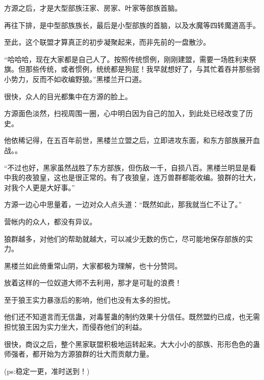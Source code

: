 \begin{this_body}
方源之后，才是大型部族汪家、房家、叶家等部族首脑。

再往下排，是中型部族族长，最后是小型部族的首脑，以及水魔等四转魔道高手。

至此，这个联盟才算真正的初步凝聚起来，而非先前的一盘散沙。

“哈哈哈，现在大家都是自己人了。按照传统惯例，刚刚建盟，需要一场胜利来祭旗。但那些传统，或者惯例，统统都是狗屁！我早就想好了，与其忙着吞并那些弱小势力，反而不如收编野狼。”黑楼兰开口道。

很快，众人的目光都集中在方源的脸上。

方源面色淡然，扫视周围一圈，心中明白因为自己的加入，到此处已经改变了历史。

他依稀记得，在五百年前世，黑楼兰立盟之后，立即进攻东面，和东方部族展开血战。。

“不过也好，黑家虽然战胜了东方部族，但伤敌一千，自损八百。黑楼兰明显是看中我的夜狼皇，这也是很正常的。有了夜狼皇，连万兽群都能收编。狼群的壮大，对我个人更是大好事。”

方源一边心中思量着，一边对众人点头道：“既然如此，那我就当仁不让了。”

营帐内的众人，都没有异议。

狼群越多，对他们的帮助就越大，可以减少无数的伤亡，尽可能地保存部族的实力。

黑楼兰如此倚重常山阴，大家都极为理解，也十分赞同。

放着这样的一位奴道大师不去利用，那才是可耻的浪费！

至于狼王实力暴涨后的影响，他们也没有太多的担忧。

他们还不知道言而无信蛊，对毒誓蛊的制约效果十分信任。既然盟约已成，也无需担忧狼王因为实力坐大，而侵吞他们的利益。

很快，商议之后，整个黑家联盟积极地运转起来。大大小小的部族、形形色色的蛊师强者，都开始为方源狼群的壮大而贡献力量。

(ps:稳定一更，准时送到！)

\end{this_body}

